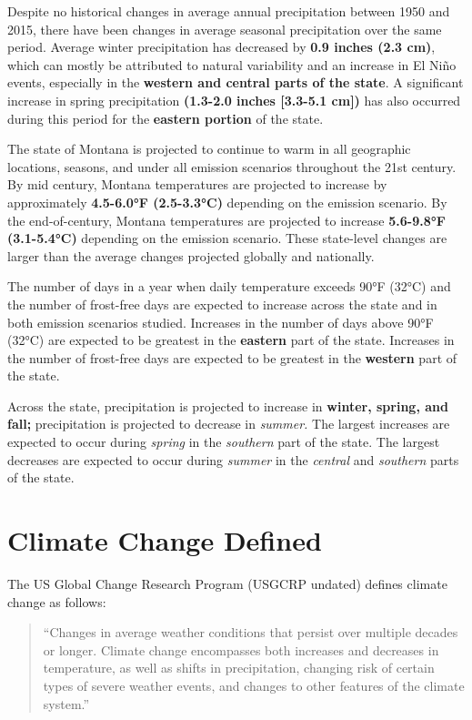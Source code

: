 \documentclass[
  letterpaper,
]{scrreprt}\usepackage{amsmath,amssymb}
\begin{document}
Despite no historical changes in average annual precipitation between
1950 and 2015, there have been changes in average seasonal precipitation
over the same period. Average winter precipitation has decreased by
\textbf{0.9 inches (2.3 cm)}, which can mostly be attributed to natural
variability and an increase in El Niño events, especially in the
\textbf{western and central parts of the state}. A significant increase
in spring precipitation \textbf{(1.3-2.0 inches {[}3.3-5.1 cm{]})} has
also occurred during this period for the \textbf{eastern portion} of the
state.

The state of Montana is projected to continue to warm in all geographic
locations, seasons, and under all emission scenarios throughout the 21st
century. By mid century, Montana temperatures are projected to increase
by approximately \textbf{4.5-6.0°F (2.5-3.3°C)} depending on the
emission scenario. By the end-of-century, Montana temperatures are
projected to increase \textbf{5.6-9.8°F (3.1-5.4°C)} depending on the
emission scenario. These state-level changes are larger than the average
changes projected globally and nationally.

The number of days in a year when daily temperature exceeds 90°F (32°C)
and the number of frost-free days are expected to increase across the
state and in both emission scenarios studied. Increases in the number of
days above 90°F (32°C) are expected to be greatest in the
\textbf{eastern} part of the state. Increases in the number of
frost-free days are expected to be greatest in the \textbf{western} part
of the state.

Across the state, precipitation is projected to increase in
\textbf{winter, spring, and fall;} precipitation is projected to
decrease in \emph{summer.} The largest increases are expected to occur
during \emph{spring} in the \emph{southern} part of the state. The
largest decreases are expected to occur during \emph{summer} in the
\emph{central} and \emph{southern} parts of the state.

\hypertarget{climate-change-defined}{%
\section*{Climate Change Defined}\label{climate-change-defined}}

The US Global Change Research Program (USGCRP undated) defines climate
change as follows:

\begin{quote}
``Changes in average weather conditions that persist over multiple
decades or longer. Climate change encompasses both increases and
decreases in temperature, as well as shifts in precipitation, changing
risk of certain types of severe weather events, and changes to other
features of the climate system.''
\end{quote}
\end{document}
